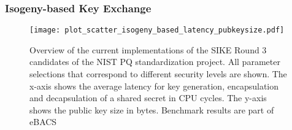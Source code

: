 \subsubsection{Isogeny-based Key Exchange}

\begin{figure}[ht]
    \centering\texttt{[image: plot\_scatter\_isogeny\_based\_latency\_pubkeysize.pdf]}
    \caption{Overview of the current implementations of the SIKE Round 3 candidates of the \acs{NIST} \acs{PQ} standardization project. All parameter selections that correspond to different security levels are shown. The x-axis shows the average latency for key generation, encapsulation and decapsulation of a shared secret in \acs{CPU} cycles. The y-axis shows the public key size in bytes. Benchmark results are part of eBACS\cite{eBACS}}\label{fig:sike_scatter}
\end{figure}

